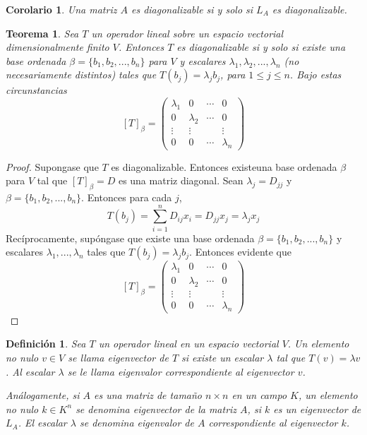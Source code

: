 \documentclass{book}
\newtheorem{theorem}{Teorema}
\newtheorem{definition}{Definición}
\newtheorem{corollary}{Corolario}
\begin{document}
\begin{corollary}
Una matriz $A$ es diagonalizable si y solo si $L_{A}$ es diagonalizable.
\end{corollary}

\begin{theorem}
Sea $T$ un operador lineal sobre un espacio vectorial dimensionalmente finito $V$. Entonces $T$ es diagonalizable si y solo si existe una base ordenada $\beta =\{b_1,b_2,...,b_n\}$ para $V$ y escalares $\lambda_1, \lambda_2, ..., \lambda_n$ (no necesariamente distintos) tales que $T(b_j)=\lambda_j b_j$, para $1\leq j \leq n$. Bajo estas circunstancias 
\[
[T]_{\beta}=
\begin{pmatrix}
\lambda_1 & 0 & \cdots & 0\\
0 & \lambda_2 & \cdots & 0\\
\vdots & \vdots &   & \vdots\\
0 & 0 & \cdots & \lambda_{n}
\end{pmatrix}
\]
\end{theorem}

\begin{proof}
Supongase que $T$ es diagonalizable. Entonces existeuna base ordenada $\beta$ para $V$ tal que $[T]_{\beta}=D$ es una matriz diagonal. Sean $\lambda_{j}=D_{jj}$ y $\beta=\{b_1,b_2,...,b_n\}$. Entonces para cada $j$,
\[
T(b_{j})=\sum_{i=1}^{n}D_{ij}x_{i}=D_{jj}x_{j}=\lambda_{j}x_{j}
\]
Recíprocamente, supóngase que existe una base ordenada $\beta=\{b_1,b_2,...,b_n\}$ y escalares $\lambda_{1},...,\lambda_{n}$ tales que $T(b_j)=\lambda_j b_j$. Entonces evidente que 
\[
[T]_{\beta}=
\begin{pmatrix}
\lambda_1 & 0 & \cdots & 0\\
0 & \lambda_2 & \cdots & 0\\
\vdots & \vdots &   & \vdots\\
0 & 0 & \cdots & \lambda_{n}
\end{pmatrix}
\]
\end{proof}

\begin{definition}
Sea $T$ un operador lineal en un espacio vectorial $V$. Un elemento no nulo $v \in V$ se llama eigenvector de $T$ si existe un escalar $\lambda$ tal que $T(v)=\lambda v$. Al escalar $\lambda$ se le llama eigenvalor correspondiente al eigenvector $v$.

Análogamente, si $A$ es una matriz de tamaño $n\times n$ en un campo $K$, un elemento no nulo $k\in K^{n}$ se denomina eigenvector de la matriz $A$, si $k$ es un eigenvector de $L_{A}$. El escalar $\lambda$ se denomina eigenvalor de $A$ correspondiente al eigenvector $k$.
\end{definition}
\end{document}

